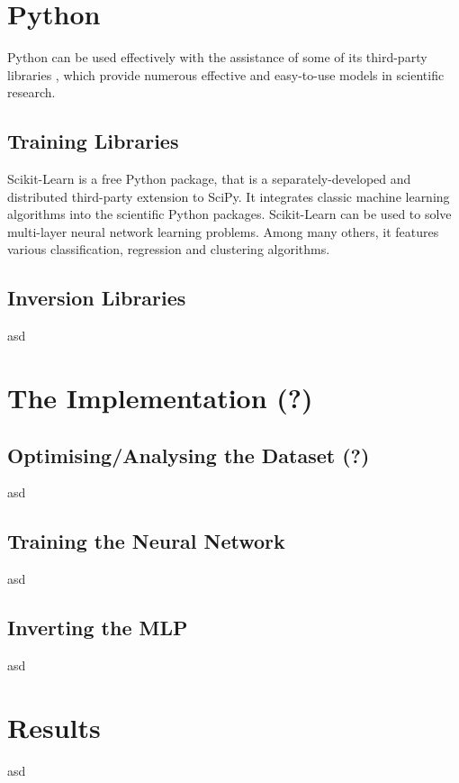 \section{Python}

Python can be used effectively with the assistance of some of its third-party libraries \cite{g2015learning} \cite{bressert2012scipy}, which provide numerous effective and easy-to-use models in scientific research. 


\subsection{Training Libraries}

Scikit-Learn is a free Python package, that is a separately-developed and distributed third-party extension to SciPy. It integrates classic machine learning algorithms into the scientific Python packages. Scikit-Learn can be used to solve multi-layer neural network learning problems. Among many others, it features various classification, regression and clustering algorithms.



\subsection{Inversion Libraries}

asd




\section{The Implementation (?)}



\subsection{Optimising/Analysing the Dataset (?)}

asd


\subsection{Training the Neural Network}

asd


\subsection{Inverting the MLP}

asd




\section{Results}

asd